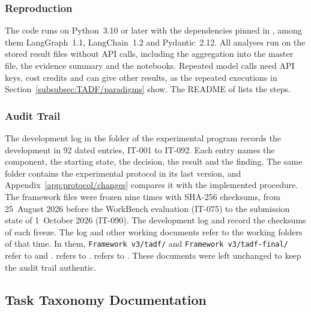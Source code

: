 \subsubsection{Reproduction}
\label{app:repository/reproduction}

The code runs on Python~3.10 or later with the dependencies pinned in , among them LangGraph~1.1, LangChain~1.2 and Pydantic~2.12. All analyses run on the stored result files without API calls, including the aggregation into the master file, the evidence summary and the notebooks. Repeated model calls need API keys, cost credits and can give other results, as the repeated executions in Section~\ref{subsubsec:TADF/paradigms} show. The README of  lists the steps.

\subsubsection{Audit Trail}
\label{app:repository/audit}

The development log in the folder  of the experimental program records the development in 92 dated entries, IT-001 to IT-092. Each entry names the component, the starting state, the decision, the result and the finding. The same folder contains the experimental protocol in its last version, and Appendix~\ref{app:protocol/changes} compares it with the implemented procedure. The framework files were frozen nine times with SHA-256 checksums, from 25~August 2026 before the WorkBench evaluation (IT-075) to the submission state of 1~October 2026 (IT-090). The development log and  record the checksums of each freeze. The log and other working documents refer to the working folders of that time. In them, \texttt{Framework v3/tadf/} and \texttt{Framework v3/tadf-final/} refer to  and .  refers to .  refers to . These documents were left unchanged to keep the audit trail authentic.



\subsection{Task Taxonomy Documentation}
\label{app:taxonomy}

